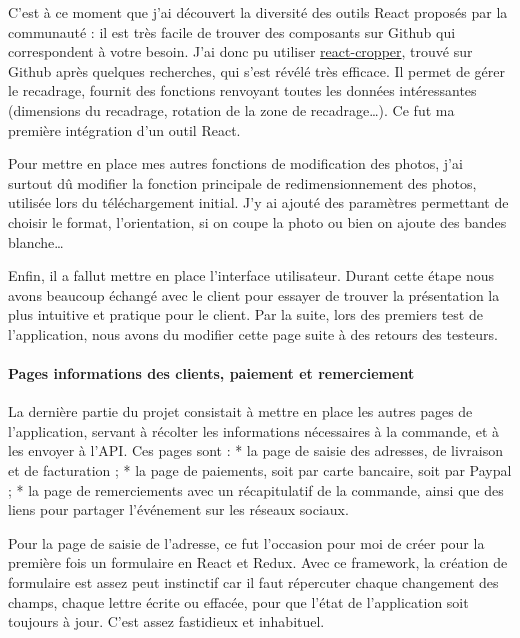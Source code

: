 \bigskip

C'est à ce moment que j'ai découvert la diversité des outils React
proposés par la communauté : il est très facile de trouver des
composants sur Github qui correspondent à votre besoin. J'ai donc pu
utiliser
\href{https://github.com/roadmanfong/react-cropper}{react-cropper},
trouvé sur Github après quelques recherches, qui s'est révélé très
efficace. Il permet de gérer le recadrage, fournit des fonctions
renvoyant toutes les données intéressantes (dimensions du recadrage,
rotation de la zone de recadrage\ldots{}). Ce fut ma première
intégration d'un outil React.

\bigskip

Pour mettre en place mes autres fonctions de modification des photos,
j'ai surtout dû modifier la fonction principale de redimensionnement des
photos, utilisée lors du téléchargement initial. J'y ai ajouté des
paramètres permettant de choisir le format, l'orientation, si on coupe
la photo ou bien on ajoute des bandes blanche\ldots{}

\bigskip

Enfin, il a fallut mettre en place l'interface utilisateur. Durant cette
étape nous avons beaucoup échangé avec le client pour essayer de trouver
la présentation la plus intuitive et pratique pour le client. Par la
suite, lors des premiers test de l'application, nous avons du modifier
cette page suite à des retours des testeurs.

\paragraph{Pages informations des clients, paiement et
remerciement}\label{pages-informations-des-clients-paiement-et-remerciement}

\bigskip

La dernière partie du projet consistait à mettre en place les autres
pages de l'application, servant à récolter les informations nécessaires
à la commande, et à les envoyer à l'API. Ces pages sont : * la page de
saisie des adresses, de livraison et de facturation ; * la page de
paiements, soit par carte bancaire, soit par Paypal ; * la page de
remerciements avec un récapitulatif de la commande, ainsi que des liens
pour partager l'événement sur les réseaux sociaux.

\bigskip

Pour la page de saisie de l'adresse, ce fut l'occasion pour moi de créer
pour la première fois un formulaire en React et Redux. Avec ce
framework, la création de formulaire est assez peut instinctif car il
faut répercuter chaque changement des champs, chaque lettre écrite ou
effacée, pour que l'état de l'application soit toujours à jour. C'est
assez fastidieux et inhabituel.

